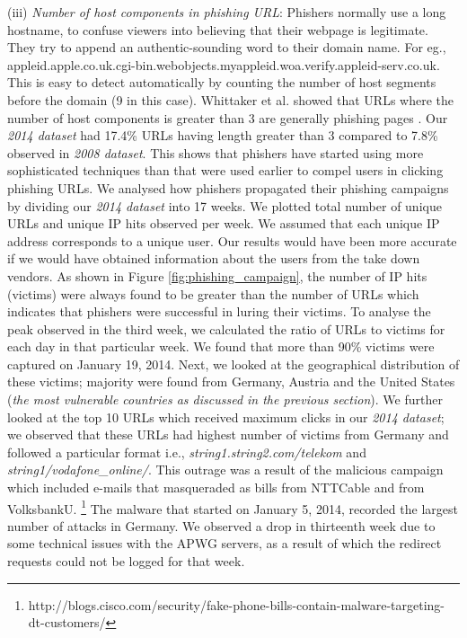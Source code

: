 \documentclass[conference]{IEEEtran}
\begin{document}
\newline\indent
(iii) \textit{Number of host components in phishing URL}: Phishers normally use a long hostname, to confuse viewers into believing that their webpage is legitimate. They try to append an authentic-sounding word to their domain name. For eg., appleid.apple.co.uk.cgi-bin.webobjects.myappleid.woa.verify.appleid-serv.co.uk. This is easy to detect automatically by counting the number of host segments before the domain (9 in this case). Whittaker et al. showed that URLs where the number of host components is greater than 3 are generally phishing pages \cite{colin}. Our \textit{2014 dataset} had 17.4\%   URLs having length greater than 3 compared to 7.8\% observed in \textit{2008 dataset}. This shows that phishers have started using more sophisticated techniques than that were used earlier to compel users in clicking phishing URLs.
\newline
\newline\indent
We analysed how phishers propagated their phishing campaigns by dividing our \textit{2014 dataset} into 17 weeks. We plotted total number of unique URLs and unique IP hits observed per week. We assumed that each unique IP address corresponds to a unique user. Our results would have been more accurate if we would have obtained information about the users from the take down vendors. As shown in Figure \ref{fig:phishing_campaign}, the number of IP hits (victims) were always found to be greater than the number of URLs which indicates that phishers were successful in luring their victims. To analyse the peak observed in the third week, we calculated the ratio of URLs to victims for each day in that particular week. We found that more than 90\% victims were captured on January 19, 2014. Next, we looked at the geographical distribution of these victims; majority were found from Germany, Austria and the United States (\textit{the most vulnerable countries as discussed in the previous section}). We further looked at the top 10 URLs which received maximum clicks in our \textit{2014 dataset}; we observed that these URLs had highest number of victims from Germany and followed a particular format i.e., \textit{string1.string2.com/telekom} and \textit{string1/vodafone\_online/}. This outrage was a result of the malicious campaign which included e-mails that masqueraded as bills from NTTCable and from VolksbankU. \footnote{http://blogs.cisco.com/security/fake-phone-bills-contain-malware-targeting-dt-customers/} The malware that started on January 5, 2014, recorded the largest number of attacks in Germany. We observed a drop in thirteenth week due to some technical issues with the APWG servers, as a result of which the redirect requests could not be logged for that week.
\end{document}
